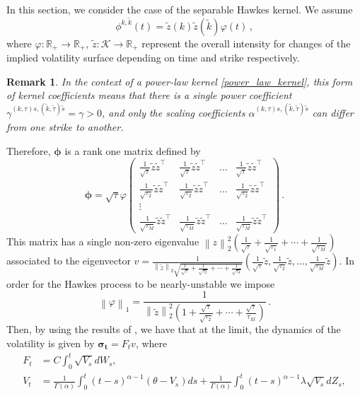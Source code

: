 \documentclass[12pt]{article}
\newtheorem{remark}[theorem2]{Remark}
\def \R{\mathbb{R}}
\newcommand{\norm}[1]{\left \lVert #1 \right \rVert_1}
\newcommand{\normsq}[1]{\left \lVert #1 \right \rVert_2}
\begin{document}
In this section, we consider the case of the separable Hawkes kernel. We assume 
\[
\phi^{k,\tilde{k}}(t) = \tilde z(k) \tilde z(\tilde{k}) \varphi(t) \, ,
\]
where $\varphi \colon \R_+ \to \R_+ $, $\tilde z : \mathcal{K} \to \R_+$  represent the overall intensity for changes of the implied volatility surface depending on time and strike respectively. 
\begin{remark}
In the context of a power-law kernel \eqref{power_law_kernel}, this form of kernel coefficients means that there is a single power coefficient $\gamma^{(k,\tau)s,(\tilde{k},\tilde{\tau})\tilde{s}}=\gamma>0$, and only the scaling coefficients $\alpha^{(k,\tau)s,(\tilde{k},\tilde{\tau})\tilde{s}}$ can differ from one strike to another. 
\end{remark}
Therefore, $\boldsymbol{\phi}$ is a rank one matrix defined by
\[
\bm{\phi} = \sqrt{\tau} \varphi \begin{pmatrix}
\frac{1}{\sqrt{\tau}}\tilde z \tilde z^\top & \frac{1}{\sqrt{\tau}}\tilde z \tilde z^\top & \dots & \frac{1}{\sqrt{\tau}}\tilde z \tilde z^\top\\
\frac{1}{\sqrt{\tau_2}} \tilde z \tilde z^\top &  \frac{1}{\sqrt{\tau_2}} \tilde z \tilde z^\top  & \dots & \frac{1}{\sqrt{\tau_2}} \tilde z \tilde z^\top \\
\vdots \\
\frac{1}{\sqrt{\tau_M}} \tilde z \tilde z^\top & \frac{1}{\sqrt{\tau_M}} \tilde z \tilde z^\top & \dots & \frac{1}{\sqrt{\tau_M}} \tilde z \tilde z^\top
\end{pmatrix} \, .
\]
This matrix has a single non-zero eigenvalue $\normsq{z}^2 (\frac{1}{\sqrt{\tau}}+\frac{1}{\sqrt{\tau_1}} + \cdots + \frac{1}{\sqrt{\tau_M}})$ associated to the eigenvector $v = \frac{1}{\normsq{\tilde z} \sqrt{\frac{1}{\sqrt{\tau}}+\frac{1}{\sqrt{\tau_2}} + \cdots + \frac{1}{\sqrt{\tau_d}}}} (\frac{1}{\sqrt{\tau}}\tilde z , \frac{1}{\sqrt{\tau_2}} \tilde z, \dots, \frac{1}{\sqrt{\tau_M}} \tilde z )$. In order for the Hawkes process to be nearly-unstable we impose
\[
\norm{\varphi} = \frac{1}{\normsq{\tilde z}^2 (1+\frac{\sqrt{\tau}}{\sqrt{\tau_2}} + \cdots + \frac{\sqrt{\tau}}{\tau_M})} \, .
\]
Then, by using the results of \cite{el2018microstructural}, we have that at the limit, the dynamics of the volatility is given by $\boldsymbol{\sigma_t} = F_t v$, where 
\begin{align*}
    F_t &= C \int_0^t \sqrt{V_s} dW_s, \\
    V_t &= \frac{1}{\Gamma(\alpha)} \int_0^t (t-s)^{\alpha - 1} (\theta - V_s) ds + \frac{1}{\Gamma(\alpha)} \int_0^t (t-s)^{\alpha - 1} \lambda \sqrt{V_s} dZ_s,
\end{align*}
\end{document}
